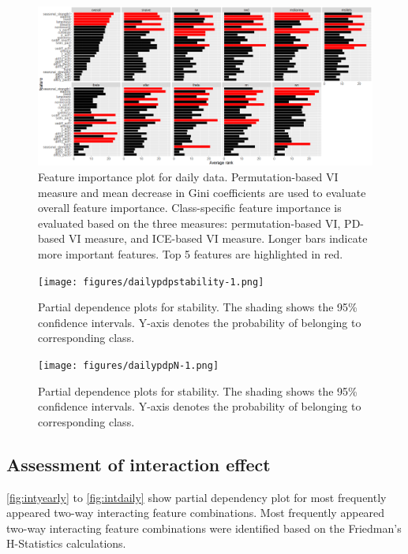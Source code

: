 \documentclass[11pt,a4paper,]{article}
\begin{document}
\begin{figure}[h]

{\centering \includegraphics{figures/vidaily-1} 

}

\caption{Feature importance plot for daily data. Permutation-based VI measure and mean decrease in Gini coefficients are used to evaluate overall feature importance. Class-specific feature importance is evaluated based on the three measures: permutation-based VI, PD-based VI measure, and ICE-based VI measure. Longer bars indicate more important features. Top 5 features are highlighted in red.}\label{fig:vidaily}
\end{figure}

\begin{figure}
\centering
\texttt{[image: figures/dailypdpstability-1.png]}
\caption{\label{fig:dailypdpstability}Partial dependence plots for
stability. The shading shows the 95\% confidence intervals. Y-axis
denotes the probability of belonging to corresponding class.}
\end{figure}

\begin{figure}
\centering
\texttt{[image: figures/dailypdpN-1.png]}
\caption{\label{fig:dailypdpN}Partial dependence plots for stability. The
shading shows the 95\% confidence intervals. Y-axis denotes the
probability of belonging to corresponding class.}
\end{figure}

\subsection{Assessment of interaction
effect}\label{assessment-of-interaction-effect-1}

\autoref{fig:intyearly} to \autoref{fig:intdaily} show partial
dependency plot for most frequently appeared two-way interacting feature
combinations. Most frequently appeared two-way interacting feature
combinations were identified based on the Friedman's H-Statistics
calculations.
\end{document}
